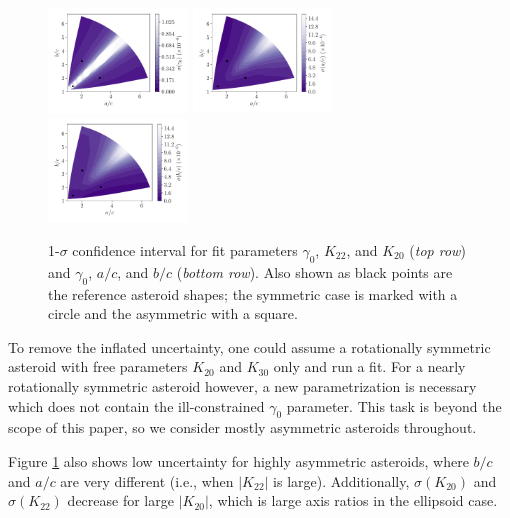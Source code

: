 \documentclass[fleqn,usenatbib]{mnras}
\begin{document}
\begin{figure}
  \includegraphics[width=0.33\textwidth]{figs/probe-space-ab-1-sigma.pdf}\hfill
  \includegraphics[width=0.33\textwidth]{figs/probe-space-ab-a-sigma.pdf}\hfill
  \includegraphics[width=0.33\textwidth]{figs/probe-space-ab-b-sigma.pdf}

  \caption{1-$\sigma$ confidence interval for fit parameters $\gamma_0$, $K_{22}$, and $K_{20}$ (\textit{top row}) and $\gamma_0$, $a/c$, and $b/c$ (\textit{bottom row}). Also shown as black points are the reference asteroid shapes; the symmetric case is marked with a circle and the asymmetric with a square.}
  \label{fig:scan-space-sigma}
\end{figure}

To remove the inflated uncertainty, one could assume a rotationally symmetric asteroid with free parameters $K_{20}$ and $K_{30}$ only and run a fit. For a nearly rotationally symmetric asteroid however, a new parametrization is necessary which does not contain the ill-constrained $\gamma_0$ parameter. This task is beyond the scope of this paper, so we consider mostly asymmetric asteroids throughout.

Figure \ref{fig:scan-space-sigma} also shows low uncertainty for highly asymmetric asteroids, where $b/c$ and $a/c$ are very different (i.e., when $|K_{22}|$ is large). Additionally, $\sigma(K_{20})$ and $\sigma(K_{22})$ decrease for large $|K_{20}|$, which is large axis ratios in the ellipsoid case.
\end{document}
